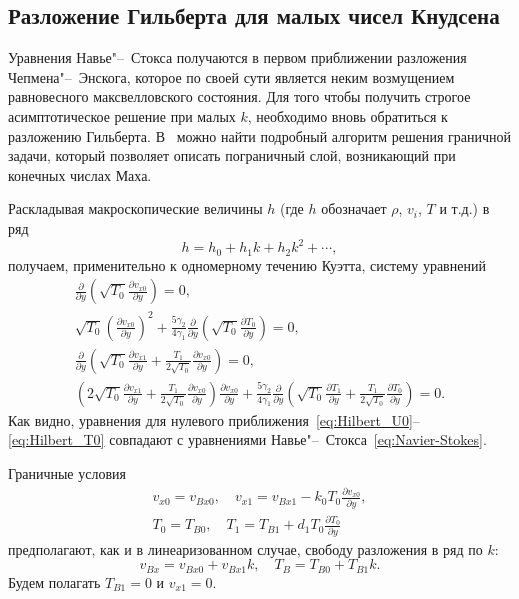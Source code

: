 \documentclass[a4paper,12pt]{article}
\newcommand{\pder}[2][]{\frac{\partial#1}{\partial#2}}
\begin{document}
\subsection{Разложение Гильберта для малых чисел Кнудсена}

Уравнения Навье"--~Стокса получаются в первом приближении разложения Чепмена"--~Энскога,
которое по своей сути является неким возмущением равновесного максвелловского состояния.
Для того чтобы получить строгое асимптотическое решение при малых \(k\),
необходимо вновь обратиться к разложению Гильберта.
В~\cite{Sone2000, Sone2002} можно найти подробный алгоритм решения граничной задачи,
который позволяет описать пограничный слой, возникающий при конечных числах Маха.

Раскладывая макроскопические величины \(h\) (где \(h\) обозначает \(\rho\), \(v_i\), \(T\) и т.д.) в ряд
\begin{equation}\label{eq:hilbert_expansion}
    h = h_0 + h_1k + h_2k^2 + \cdots,
\end{equation}
получаем, применительно к одномерному течению Куэтта, систему уравнений
\begin{gather}
    \pder{y}\left( \sqrt{T_0}\pder[v_{x0}]{y} \right) = 0, \label{eq:Hilbert_U0}\\
    \sqrt{T_0}\left( \pder[v_{x0}]{y}\right)^2 + \frac{5\gamma_2}{4\gamma_1}\pder{y}\left(\sqrt{T_0}\pder[T_0]{y} \right) = 0, \label{eq:Hilbert_T0}\\
    \pder{y}\left( \sqrt{T_0}\pder[v_{x1}]{y} + \frac{T_1}{2\sqrt{T_0}}\pder[v_{x0}]{y} \right) = 0, \label{eq:Hilbert_U1}\\
    \left( 2\sqrt{T_0}\pder[v_{x1}]{y} + \frac{T_1}{2\sqrt{T_0}}\pder[v_{x0}]{y} \right) \pder[v_{x0}]{y}
        + \frac{5\gamma_2}{4\gamma_1} \pder{y}\left( \sqrt{T_0}\pder[T_1]{y} + \frac{T_1}{2\sqrt{T_0}}\pder[T_0]{y} \right) = 0. \label{eq:Hilbert_T1}
\end{gather}
Как видно, уравнения для нулевого приближения~\eqref{eq:Hilbert_U0}--\eqref{eq:Hilbert_T0}
совпадают с уравнениями Навье"--~Стокса~\eqref{eq:Navier-Stokes}.

Граничные условия
\begin{gather}\label{eq:hilbert_bc}
    v_{x0} = v_{Bx0}, \quad v_{x1} = v_{Bx1} - k_0 T_0 \pder[v_{x0}]{y}, \\
    T_0 = T_{B0}, \quad T_1 = T_{B1} + d_1 T_0 \pder[T_0]{y}
\end{gather}
предполагают, как и в линеаризованном случае, свободу разложения в ряд по \(k\):
\begin{equation}\label{eq:hilbert_boundary_expansion}
    v_{Bx} = v_{Bx0} + v_{Bx1}k, \quad T_B = T_{B0} + T_{B1}k.
\end{equation}
Будем полагать \(T_{B1} = 0\) и \(v_{x1} = 0\).
\end{document}
